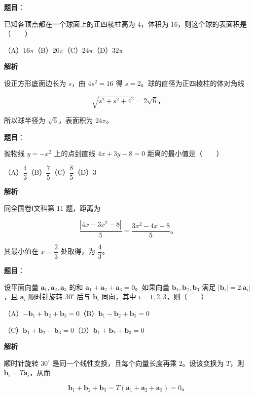 \begin{answer}

\textbf{题目}：

已知各顶点都在一个球面上的正四棱柱高为 $4$，体积为 $16$，则这个球的表面积是\mbox{（　　）}

（A）$16\pi$\quad（B）$20\pi$\quad（C）$24\pi$\quad（D）$32\pi$

\textbf{解析}

设正方形底面边长为 $s$，由 $4s^2=16$ 得 $s=2$。球的直径为正四棱柱的体对角线

\nopagebreak[4]
\[
\sqrt{s^2+s^2+4^2}=2\sqrt6\text{，}
\]

所以球半径为 $\sqrt6$，表面积为 $24\pi$。


\end{answer}
\begin{answer}

\textbf{题目}：

抛物线 $y=-x^2$ 上的点到直线 $4x+3y-8=0$ 距离的最小值是\mbox{（　　）}

（A）$\dfrac43$\quad（B）$\dfrac75$\quad（C）$\dfrac85$\quad（D）$3$

\textbf{解析}

同全国卷Ⅰ文科第 11 题，距离为

\nopagebreak[4]
\[
\frac{|4x-3x^2-8|}{5}=\frac{3x^2-4x+8}{5}\text{。}
\]

其最小值在 $x=\dfrac23$ 处取得，为 $\dfrac43$。


\end{answer}
\begin{answer}

\textbf{题目}：

设平面向量 $\boldsymbol a_1,\boldsymbol a_2,\boldsymbol a_3$ 的和 $\boldsymbol a_1+\boldsymbol a_2+\boldsymbol a_3=0$。如果向量 $\boldsymbol b_1,\boldsymbol b_2,\boldsymbol b_3$ 满足 $|\boldsymbol b_i|=2|\boldsymbol a_i|$，且 $\boldsymbol a_i$ 顺时针旋转 $30^\circ$ 后与 $\boldsymbol b_i$ 同向，其中 $i=1,2,3$，则\mbox{（　　）}

（A）$-\boldsymbol b_1+\boldsymbol b_2+\boldsymbol b_3=0$\quad（B）$\boldsymbol b_1-\boldsymbol b_2+\boldsymbol b_3=0$

（C）$\boldsymbol b_1+\boldsymbol b_2-\boldsymbol b_3=0$\quad（D）$\boldsymbol b_1+\boldsymbol b_2+\boldsymbol b_3=0$

\textbf{解析}

顺时针旋转 $30^\circ$ 是同一个线性变换，且每个向量长度再乘 $2$。设该变换为 $T$，则 $\boldsymbol b_i=T\boldsymbol a_i$，从而

\nopagebreak[4]
\[
\boldsymbol b_1+\boldsymbol b_2+\boldsymbol b_3
=T(\boldsymbol a_1+\boldsymbol a_2+\boldsymbol a_3)=0\text{。}
\]


\end{answer}
